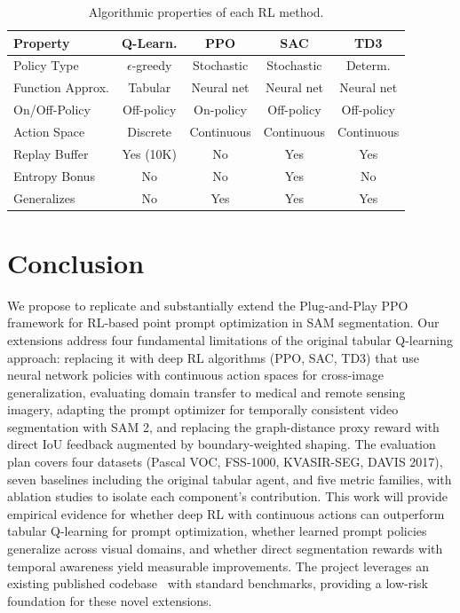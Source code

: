 \documentclass[journal, onecolumn]{IEEEtran}
\begin{document}
\begin{table}[t]
\centering
\caption{Algorithmic properties of each RL method.}
\label{tab:algo_properties}
\begin{tabular}{@{}lcccc@{}}
\toprule
\textbf{Property} & \textbf{Q-Learn.} & \textbf{PPO} & \textbf{SAC} & \textbf{TD3} \\
\midrule
Policy Type         & $\epsilon$-greedy & Stochastic & Stochastic & Determ. \\
Function Approx.    & Tabular    & Neural net & Neural net & Neural net \\
On/Off-Policy       & Off-policy & On-policy  & Off-policy & Off-policy \\
Action Space        & Discrete   & Continuous & Continuous & Continuous \\
Replay Buffer       & Yes (10K)  & No         & Yes        & Yes \\
Entropy Bonus       & No         & No         & Yes        & No \\
Generalizes         & No         & Yes        & Yes        & Yes \\
\bottomrule
\end{tabular}
\end{table}

\section{Conclusion}

We propose to replicate and substantially extend the Plug-and-Play PPO framework for RL-based point prompt optimization in SAM segmentation. Our extensions address four fundamental limitations of the original tabular Q-learning approach: replacing it with deep RL algorithms (PPO, SAC, TD3) that use neural network policies with continuous action spaces for cross-image generalization, evaluating domain transfer to medical and remote sensing imagery, adapting the prompt optimizer for temporally consistent video segmentation with SAM 2, and replacing the graph-distance proxy reward with direct IoU feedback augmented by boundary-weighted shaping. The evaluation plan covers four datasets (Pascal VOC, FSS-1000, KVASIR-SEG, DAVIS 2017), seven baselines including the original tabular agent, and five metric families, with ablation studies to isolate each component's contribution. This work will provide empirical evidence for whether deep RL with continuous actions can outperform tabular Q-learning for prompt optimization, whether learned prompt policies generalize across visual domains, and whether direct segmentation rewards with temporal awareness yield measurable improvements. The project leverages an existing published codebase~\cite{Liu2025PlugAndPlayPPO} with standard benchmarks, providing a low-risk foundation for these novel extensions.



\nocite{*}
\end{document}
